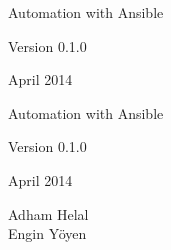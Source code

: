 \documentclass[10pt]{book}
\newcommand{\thetitle}{Automation with Ansible}
\newcommand{\theversion}{0.1.0}
\newcommand{\thedate}{April 2014}
\begin{document}
\begin{latexonly}

\renewcommand{\blankpage}{\thispagestyle{empty} \quad \newpage}




\thispagestyle{empty}

\begin{flushright}
\vspace*{2.0in}

\begin{spacing}{3}
{\huge \thetitle}\\
\end{spacing}

\vspace{0.25in}

Version \theversion

\thedate

\vfill

\end{flushright}


\blankpage
\blankpage


\pagebreak
\thispagestyle{empty}

\begin{flushright}
\vspace*{2.0in}

\begin{spacing}{3}
{\huge \thetitle}\\
\end{spacing}

\vspace{0.25in}

Version \theversion

\thedate

\vspace{1in}


{\Large
Adham Helal\\
Engin Yöyen\\
}


\vspace{0.5in}


\vfill

\end{flushright}



\end{latexonly}
\end{document}
